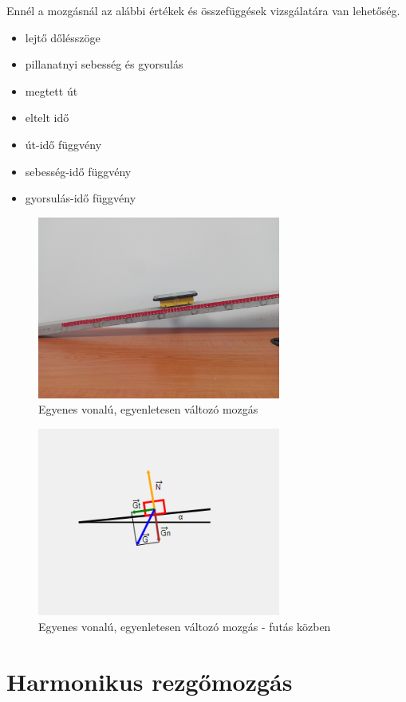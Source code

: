 \documentclass{thesis-ekf}
\theoremstyle{definition}
\theoremstyle{remark}
\begin{document}
Ennél a mozgásnál az alábbi értékek és összefüggések vizsgálatára van lehetőség.
\begin{itemize}
	\item lejtő dőlésszöge
	\item pillanatnyi sebesség és gyorsulás
	\item megtett út
	\item eltelt idő
	\item út-idő függvény
	\item sebesség-idő függvény
	\item gyorsulás-idő függvény
\end{itemize}

	\begin{figure}[!h]
		\centering
		\includegraphics[width=8cm]{EVEGYM_real}
		\caption{Egyenes vonalú, egyenletesen változó mozgás}\label{EVEGYM1}
	\end{figure}
	\begin{figure}[!h]
		\centering
		\includegraphics[width=8cm]{EVEGYM}
		\caption{Egyenes vonalú, egyenletesen változó mozgás - futás közben}\label{EVEGYM2}
	\end{figure}
\pagebreak


\section{Harmonikus rezgőmozgás}
\end{document}
